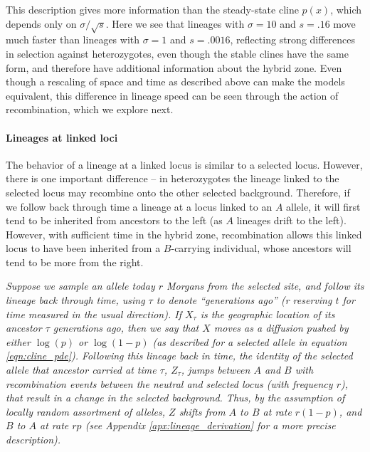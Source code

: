 \documentclass[11pt,letterpaper]{article}
\newcommand{\yb}[1]{{\em \color{magenta} #1}}
\begin{document}
This description gives more information than the steady-state cline $p(x)$,
which depends only on $\sigma/\sqrt{s}$.
Here we see that lineages with $\sigma=10$ and $s=.16$ move much faster
than lineages with $\sigma=1$ and $s=.0016$,
reflecting strong differences in selection against heterozygotes,
even though the stable clines have the same form, and therefore have additional information about the hybrid zone.
Even though a rescaling of space and time as described above can make the models equivalent,
this difference in lineage speed can be seen through the action of recombination, which we explore next.

\paragraph{Lineages at linked loci}
The behavior of a lineage at a linked locus is similar to a selected locus. 
However, there is one important difference -- 
in heterozygotes the lineage linked to the selected locus may
recombine onto the other selected background.
Therefore, if we follow back through time a lineage at a locus linked to an $A$ allele, 
it will first tend to be inherited from ancestors to the left (as $A$ lineages drift to the left). 
However, with sufficient time in the hybrid zone, recombination allows this linked locus 
to have been inherited from a $B$-carrying individual,
whose ancestors will tend to be more from the right.

\yb{Suppose we sample an allele today $r$ Morgans from the selected site, and  
follow its lineage back through time, using $\tau$ to denote ``generations ago'' (r
reserving $t$ for time measured in the usual direction).
If $X_\tau$ is the geographic location of its ancestor $\tau$ generations ago,
then we say that $X$ moves as a diffusion pushed by either $\log(p)$ or $\log(1-p)$ 
(as described for a selected allele in equation \eqref{eqn:cline_pde}).
Following this lineage back in time, the identity of the selected allele that ancestor carried at time $\tau$, $Z_\tau$, 
 jumps between $A$ and $B$ with recombination events between the neutral and selected locus (with frequency $r$), that result in a change in the  selected background.    
Thus, by the assumption of locally random assortment of alleles, $Z$ shifts from $A$ to $B$  at rate $r (1-p)$, and $B$ to $A$ at rate $r p$ (see Appendix \ref{apx:lineage_derivation} for a more precise description).}
\end{document}
